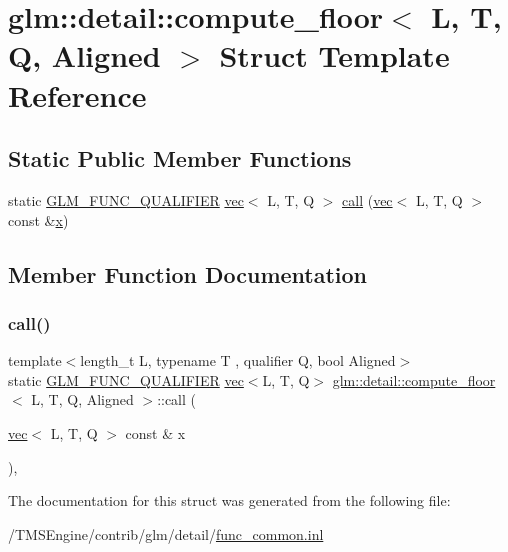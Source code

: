 \hypertarget{structglm_1_1detail_1_1compute__floor}{}\section{glm\+:\+:detail\+:\+:compute\+\_\+floor$<$ L, T, Q, Aligned $>$ Struct Template Reference}
\label{structglm_1_1detail_1_1compute__floor}
\subsection*{Static Public Member Functions}
\begin{DoxyCompactItemize}
\item 
static \hyperlink{setup_8hpp_a33fdea6f91c5f834105f7415e2a64407}{G\+L\+M\+\_\+\+F\+U\+N\+C\+\_\+\+Q\+U\+A\+L\+I\+F\+I\+ER} \hyperlink{structglm_1_1vec}{vec}$<$ L, T, Q $>$ \hyperlink{structglm_1_1detail_1_1compute__floor_aa34d64f5823c463b6358bd11038d320e}{call} (\hyperlink{structglm_1_1vec}{vec}$<$ L, T, Q $>$ const \&\hyperlink{_s_d_l__opengl_8h_ad0e63d0edcdbd3d79554076bf309fd47}{x})
\end{DoxyCompactItemize}


\subsection{Member Function Documentation}
\mbox{\label{structglm_1_1detail_1_1compute__floor_aa34d64f5823c463b6358bd11038d320e}} 
\subsubsection{\texorpdfstring{call()}{call()}}
{\footnotesize\ttfamily template$<$length\+\_\+t L, typename T , qualifier Q, bool Aligned$>$ \\
static \hyperlink{setup_8hpp_a33fdea6f91c5f834105f7415e2a64407}{G\+L\+M\+\_\+\+F\+U\+N\+C\+\_\+\+Q\+U\+A\+L\+I\+F\+I\+ER} \hyperlink{structglm_1_1vec}{vec}$<$L, T, Q$>$ \hyperlink{structglm_1_1detail_1_1compute__floor}{glm\+::detail\+::compute\+\_\+floor}$<$ L, T, Q, Aligned $>$\+::call (\begin{DoxyParamCaption}\item[{\hyperlink{structglm_1_1vec}{vec}$<$ L, T, Q $>$ const \&}]{x }\end{DoxyParamCaption})\hspace{0.3cm}{\ttfamily [inline]}, {\ttfamily [static]}}



The documentation for this struct was generated from the following file\+:\begin{DoxyCompactItemize}
\item 
/\+T\+M\+S\+Engine/contrib/glm/detail/\hyperlink{func__common_8inl}{func\+\_\+common.\+inl}\end{DoxyCompactItemize}
